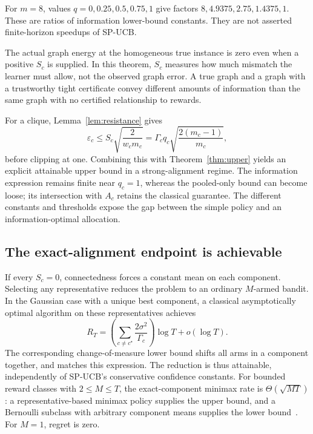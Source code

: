 \documentclass[11pt]{article}
\begin{document}
For $m=8$, values $q=0,0.25,0.5,0.75,1$ give factors $8,4.9375,2.75,1.4375,1$. These are ratios of information lower-bound constants. They are not asserted finite-horizon speedups of SP-UCB.

The actual graph energy at the homogeneous true instance is zero even when a positive $S_c$ is supplied. In this theorem, $S_c$ measures how much mismatch the learner must allow, not the observed graph error. A true graph and a graph with a trustworthy tight certificate convey different amounts of information than the same graph with no certified relationship to rewards.

For a clique, Lemma~\ref{lem:resistance} gives
\begin{equation}
 \varepsilon_c\le S_c\sqrt{\frac{2}{w_cm_c}}
 =\Gamma_c q_c\sqrt{\frac{2(m_c-1)}{m_c}},
 \label{eq:cliquewidth}
\end{equation}
before clipping at one. Combining this with Theorem~\ref{thm:upper} yields an explicit attainable upper bound in a strong-alignment regime. The information expression remains finite near $q_c=1$, whereas the pooled-only bound can become loose; its intersection with $A_c$ retains the classical guarantee. The different constants and thresholds expose the gap between the simple policy and an information-optimal allocation.



\subsection{The exact-alignment endpoint is achievable}
If every $S_c=0$, connectedness forces a constant mean on each component. Selecting any representative reduces the problem to an ordinary $M$-armed bandit. In the Gaussian case with a unique best component, a classical asymptotically optimal algorithm on these representatives achieves
\begin{equation}
 R_T=\left(\sum_{c\ne c^\star}\frac{2\sigma^2}{\Gamma_c}\right)\log T
      +o(\log T).
 \label{eq:exact}
\end{equation}
The corresponding change-of-measure lower bound shifts all arms in a component together, and matches this expression. The reduction is thus attainable, independently of SP-UCB's conservative confidence constants. For bounded reward classes with $2\le M\le T$, the exact-component minimax rate is $\Theta(\sqrt{MT})$: a representative-based minimax policy supplies the upper bound, and a Bernoulli subclass with arbitrary component means supplies the lower bound~\cite{audibert2010,lattimore2020}. For $M=1$, regret is zero.
\end{document}
